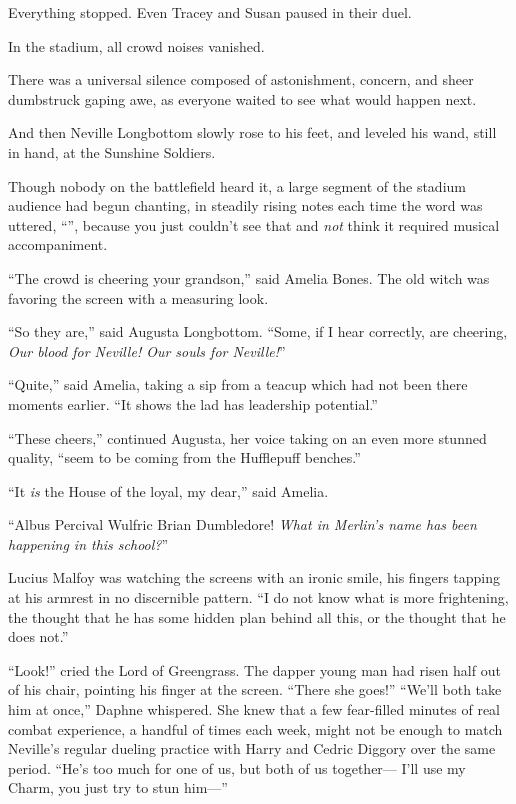 Everything stopped. Even Tracey and Susan paused in their
duel.

In the stadium, all crowd noises vanished.

There was a universal silence composed of astonishment, concern,
and sheer dumbstruck gaping awe, as everyone waited to see what
would happen next.

And then Neville Longbottom slowly rose to his feet, and leveled
his wand, still in hand, at the Sunshine Soldiers.

Though nobody on the battlefield heard it, a large segment of
the stadium audience had begun chanting, in steadily rising notes
each time the word was uttered, “”, because
you just couldn’t see that and \emph{not} think it required musical
accompaniment.

“The crowd is cheering your grandson,” said Amelia Bones. The
old witch was favoring the screen with a measuring look.

“So they are,” said Augusta Longbottom. “Some, if I hear
correctly, are cheering, \emph{Our blood for Neville! Our souls for
Neville!}”

“Quite,” said Amelia, taking a sip from a teacup which had not
been there moments earlier. “It shows the lad has leadership
potential.”

“These cheers,” continued Augusta, her voice taking on an even
more stunned quality, “seem to be coming from the Hufflepuff
benches.”

“It \emph{is} the House of the loyal, my dear,” said Amelia.

“Albus Percival Wulfric Brian Dumbledore! \emph{What in Merlin’s
name has been happening in this school?}”

Lucius Malfoy was watching the screens with an ironic smile, his
fingers tapping at his armrest in no discernible pattern. “I do not
know what is more frightening, the thought that he has some hidden
plan behind all this, or the thought that he does not.”

“Look!” cried the Lord of Greengrass. The dapper young man had
risen half out of his chair, pointing his finger at the screen.
“There she goes!”
\sbreak
“We’ll both take him at once,” Daphne whispered. She knew that a
few fear-filled minutes of real combat experience, a handful of
times each week, might not be enough to match Neville’s regular
dueling practice with Harry and Cedric Diggory over the same
period. “He’s too much for one of us, but both of us together—
I’ll use my Charm, you just try to stun him—”

